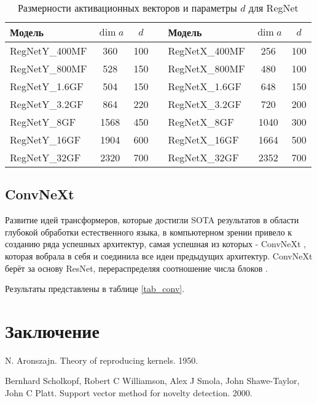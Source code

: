 \documentclass{article}
\begin{document}
\begin{large}
\begin{table}
	\caption{Размерности активационных векторов и параметры $d$ для RegNet}\label{tab_reg_pars}
	\centering
	\begin{tabular}{| l | c | c | c | l | c | c | }
		\hline
		Модель & $\dim a$ & $d$ & & Модель & $\dim a$ & $d$ \\ \hline
		RegNetY\_400MF & 360 & 100 & & RegNetX\_400MF & 256 & 100 \\ 
		RegNetY\_800MF & 528 & 150 & & RegNetX\_800MF & 480 & 100 \\ 
		RegNetY\_1.6GF & 504 & 150 & & RegNetX\_1.6GF & 648 & 150 \\ 
		RegNetY\_3.2GF & 864 & 220 & & RegNetX\_3.2GF & 720 & 200 \\ 
		RegNetY\_8GF & 1568 & 450 & & RegNetX\_8GF & 1040 & 300 \\ 
		RegNetY\_16GF & 1904 & 600 & & RegNetX\_16GF & 1664 & 500 \\ 
		RegNetY\_32GF & 2320 & 700 & & RegNetX\_32GF & 2352 & 700 \\ 
		\hline
	\end{tabular}
\end{table}

\subsection{ConvNeXt}

Развитие идей трансформеров, которые достигли SOTA результатов в области глубокой обработки естественного языка, в компьютерном зрении привело к созданию ряда успешных архитектур,  самая успешная из которых - ConvNeXt \cite{convnext}, которая вобрала в себя и соединила все идеи предыдущих архитектур. ConvNeXt берёт за основу ResNet, перераспределяя соотношение числа блоков . 

Результаты представлены в таблице \ref{tab_conv}.

\section{Заключение}

\newpage
\begin{thebibliography}{3}
	
	N. Aronszajn.
	Theory of reproducing kernels. 1950.
	
	Bernhard Scholkopf, Robert C Williamson, Alex J Smola, John Shawe-Taylor, John C Platt.
	Support vector method for novelty detection. 2000.
	

\end{thebibliography}
\end{large}
\end{document}
